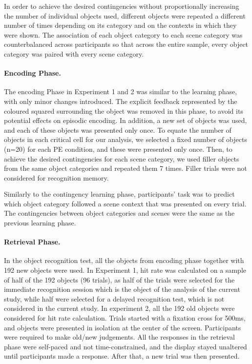 \documentclass[a4paper,12pt]{article} 			%
\begin{document}
In order to achieve the desired contingencies without proportionally increasing the number of individual objects used, different objects were repeated a different number of times depending on its category and on the contexts in which they were shown. The association of each object category to each scene category was counterbalanced across participants so that across the entire sample, every object category was paired with every scene category.
\paragraph{Encoding Phase.}
The encoding Phase in Experiment 1 and 2 was similar to the learning phase, with only minor changes introduced. The explicit feedback represented by the coloured squared surrounding the object was removed in this phase, to avoid its potential effects on episodic encoding. In addition, a new set of objects was used, and each of these objects was presented only once. To equate the number of objects in each critical cell for our analysis, we selected a fixed number of objects (n=20) for each PE condition, and these were presented only once. Then, to achieve the desired contingencies for each scene category, we used filler objects from the same object categories and repeated them 7 times. Filler trials were not considered for recognition memory. \par
Similarly to the contingency learning phase, participants' task was to predict which object category followed a scene context that was presented on every trial. The contingencies between object categories and scenes were the same as the previous learning phase. 
\paragraph{Retrieval Phase.}
In the object recognition test, all the objects from encoding phase together with 192 new objects were used. 
In Experiment 1, hit rate was calculated on a sample of half of the 192 objects (96 trials), as half of the trials were selected for the immediate recognition session which is the object of the analysis of the current study, while half were selected for a delayed recognition test, which is not considered in the current study. In experiment 2, all the 192 old objects were considered for hit rate calculation. Trials started with a fixation cross for 500ms, and objects were presented in isolation at the center of the screen. Participants were required to make old/new judgements. All the responses in the retrieval phase were self-paced and not time-constrained, and the display stayed unaltered until participants made a response. After that, a new trial was then presented.
\end{document}
